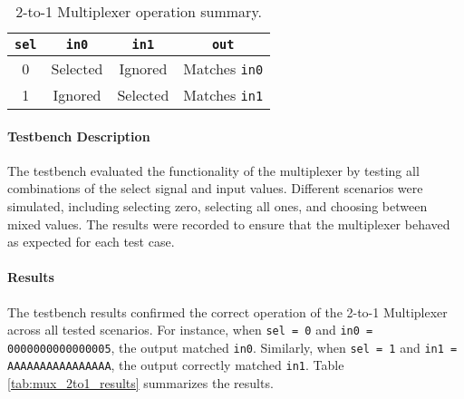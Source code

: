 \documentclass[12pt]{article}
\begin{document}
\begin{table}[h!]
    \centering
    \renewcommand{\arraystretch}{1.1}
    \setlength{\tabcolsep}{6pt}
    \begin{tabular}{|c|c|c|c|}
        \hline
        \textbf{\texttt{sel}} & \textbf{\texttt{in0}} & \textbf{\texttt{in1}} & \textbf{\texttt{out}} \\
        \hline
        0 & Selected & Ignored & Matches \texttt{in0} \\
        1 & Ignored  & Selected & Matches \texttt{in1} \\
        \hline
    \end{tabular}
    \caption{2-to-1 Multiplexer operation summary.}
    \label{tab:mux_2to1_operation}
\end{table}

\paragraph{Testbench Description}
The testbench evaluated the functionality of the multiplexer by testing all combinations of the select signal and input values. Different scenarios were simulated, including selecting zero, selecting all ones, and choosing between mixed values. The results were recorded to ensure that the multiplexer behaved as expected for each test case.

\paragraph{Results}
The testbench results confirmed the correct operation of the 2-to-1 Multiplexer across all tested scenarios. For instance, when \texttt{sel = 0} and \texttt{in0 = 0000000000000005}, the output matched \texttt{in0}. Similarly, when \texttt{sel = 1} and \texttt{in1 = AAAAAAAAAAAAAAAA}, the output correctly matched \texttt{in1}. Table \ref{tab:mux_2to1_results} summarizes the results.
\end{document}
